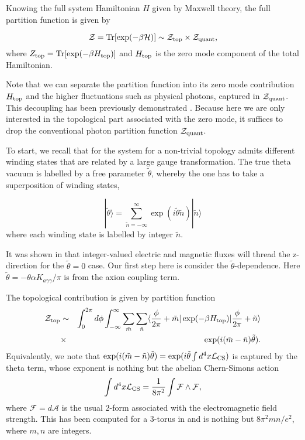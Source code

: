 \documentclass[ twocolumn,aps,prd,   
               preprintnumbers,numbers,sort&compress,nofootinbib,
                            showpacs,superscriptaddress,
               colorlinks,
               linkcolor=blue,   
               citecolor=blue]{revtex4-1}   \newcommand{\exclude}[1]{}
\DeclareMathOperator{\Tr}{Tr}
\newcommand{\be}{\begin{eqnarray}}
\newcommand{\ee}{\end{eqnarray}}
\begin{document}
Knowing the full system Hamiltonian $H$ given by Maxwell theory, the full partition function is given by 

\begin{equation}
\cal{Z}=\Tr[ \exp(-\beta H)]\sim \cal{Z}_{\rm top}\times \cal{Z}_{\rm quant},
\end{equation}
where $Z_{\rm top}=\Tr[\exp(-\beta H_{\rm top})]$ and $H_{\rm top}$ is the zero mode component of the total Hamiltonian.

Note that we can separate the partition function into its zero mode contribution $H_{\rm top}$ and the higher fluctuations such as physical photons, captured in $\cal{Z}_{\rm quant}$. This decoupling has been previously demonstrated  \cite{Cao:2013na}. Because here we are only interested in the topological part associated with the zero mode, it suffices to drop the conventional photon partition function $\cal{Z}_{\rm quant}$.

To start, we recall that for the system for a non-trivial topology admits different winding states that are related by a large gauge transformation. The true theta vacuum is labelled by a free parameter $\tilde{\theta}$, whereby the one has to take a superposition of winding states,

\begin{equation}
|\tilde{\theta}\rangle = \sum_{\tilde{n}=-\infty}^{\infty}\exp(i\tilde{\theta} \tilde{n})|\tilde{n}\rangle
\end{equation}
where each winding state is labelled by integer $\tilde{n}$. 

It was shown in  \cite{Cao:2013na,Cao:2015uza} that integer-valued electric and magnetic fluxes will thread the z-direction for the $\tilde{\theta}=0$ case. Our first step here is consider the $\tilde{\theta}$-dependence. Here $\tilde{\theta}=-\theta\alpha K_{a\gamma\gamma}/\pi$ is from the axion coupling term.

The topological contribution is given by partition function
\be
\cal{Z}_{\rm top}&\sim& \int^{2\pi}_{0}d\phi\int_{-\infty}^{\infty}\sum_{\tilde{m}}\sum_{\tilde{n}}\langle \frac{\phi}{2\pi}+\tilde{m}|\exp(-\beta H_{\rm top})|\frac{\phi}{2\pi}+\tilde{n}\rangle \nonumber \\
&\times& \exp(i(\tilde{m}-\tilde{n})\tilde{\theta}).
\ee
Equivalently, we note that $\exp(i(\tilde{m}-\tilde{n})\tilde{\theta})=\exp(i\tilde{\theta} \int d^4x \mathcal{L}_{\rm CS})$ is captured by the theta term, whose exponent is nothing but the abelian Chern-Simons action
\begin{equation}
\int d^4x \mathcal{L}_{\rm CS}=\frac{1}{8\pi^2}\int \mathcal{F}\wedge\mathcal{F},
\end{equation}
where $\mathcal{F}=d\mathcal{A}$ is the usual 2-form associated with the electromagnetic field strength. 
This has been computed for a 3-torus in  \cite{Chen-Lee:2010} and is nothing but $8\pi^2mn/e^2$, where $m,n$ are integers.
\end{document}
